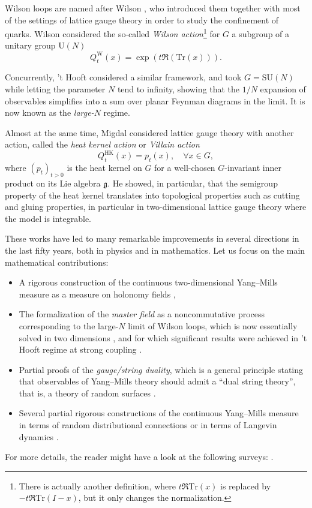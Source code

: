 \documentclass[11pt,a4paper,reqno]{article}
\theoremstyle{definition}
\theoremstyle{remark}
\newcommand\SU{{\mathrm{SU}}}
\newcommand\U{{\mathrm U}}
\newcommand\Tr{\mathrm{Tr}}
\newcommand\Wil{{\mathrm{W}}}
\newcommand\HK{{\mathrm{HK}}}
\begin{document}
Wilson loops are named after Wilson \cite{Wil74}, who introduced them together with most of the settings of lattice gauge theory in order to study the confinement of quarks. Wilson considered the so-called \emph{Wilson action}\footnote{There is actually another definition, where $t\Re\Tr(x)$ is replaced by $-t\Re\Tr(I-x)$, but it only changes the normalization.} for $G$ a subgroup of a unitary group $\U(N)$
\[
Q_t^{\Wil}(x)=\exp(t\Re(\Tr(x))).
\]

Concurrently, 't Hooft \cite{Hoo74} considered a similar framework, and took $G=\SU(N)$ while letting the parameter $N$ tend to infinity, showing that the $1/N$ expansion of observables simplifies into a sum over planar Feynman diagrams in the limit. It is now known as the \emph{large-$N$} regime.

Almost at the same time, Migdal \cite{Mig75} considered lattice gauge theory with another action, called the \emph{heat kernel action} or \emph{Villain action}
\[
Q_t^{\HK}(x)=p_t(x),\quad \forall x\in G,
\]
where $(p_t)_{t>0}$ is the heat kernel on $G$ for a well-chosen $G$-invariant inner product on its Lie algebra $\mathfrak g$. He showed, in particular, that the semigroup property of the heat kernel translates into topological properties such as cutting and gluing properties, in particular in two-dimensional lattice gauge theory where the model is integrable.

These works have led to many remarkable improvements in several directions in the last fifty years, both in physics and in mathematics. Let us focus on the main mathematical contributions:
\begin{itemize}
\item A rigorous construction of the continuous two-dimensional Yang--Mills measure as a measure on holonomy fields \cite{Dri89,Sen97,Lev03,Lev10},
\item The formalization of the \emph{master field} \cite{Sing95} as a noncommutative process corresponding to the large-$N$ limit of Wilson loops, which is now essentially solved in two dimensions \cite{Dah16,Lev17,Hal18,DN,DL23,DL25,Lem25,Dah26}, and for which significant results were achieved in 't Hooft regime at strong coupling \cite{Cha19,Jaf16,BCSK24}.
\item Partial proofs of the \emph{gauge/string duality}, which is a general principle stating that observables of Yang--Mills theory should admit a ``dual string theory'', that is, a theory of random surfaces \cite{Lev08,Jaf16,Cha19,CPS25,LemMai25,LM2}.
\item Several partial rigorous constructions of the continuous Yang--Mills measure in terms of random distributional connections or in terms of Langevin dynamics \cite{Chev19,CCHS22,CCHS24,ChevShen26,DangNohra26}.
\end{itemize}
For more details, the reader might have a look at the following surveys: \cite{LevSen17,Cha19survey,Lev20survey,Lem26survey}.
\end{document}
